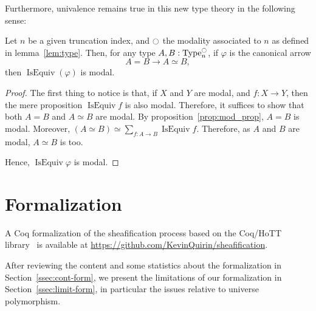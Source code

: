 \documentclass[notfinal]{jfrarticle}
\DeclareMathOperator{\Type}{Type}
\DeclareMathOperator{\IsEquiv}{IsEquiv}
\newcommand{\modal}{\ensuremath{\ocircle}}
\begin{document}
Furthermore, univalence remains
true in this new type theory in the following sense:
\begin{prop}\label{prop:univalence}
  Let $n$ be a given truncation index, and $\modal$ the modality
  associated to $n$ as defined in lemma~\ref{lem:type}. Then, for
  any type $A,B:\Type_n^\modal$, if $\varphi$ is the canonical arrow
  $$A = B \to A\simeq B,$$
  then $\IsEquiv(\varphi)$ is modal.
\end{prop}
\begin{proof}
  The first thing to notice is that, if $X$ and $Y$ are modal, and
  $f:X \to Y$, then the mere proposition $\IsEquiv f$ is also modal.
  Therefore, it suffices to show that both $A=B$ and $A\simeq B$ are
  modal. By proposition~\ref{prop:mod_prop}, $A=B$ is modal. 
  Moreover, $(A\simeq B) \simeq \sum_{f:A\to B} \IsEquiv
  f$. Therefore, as $A$ and $B$ are modal, $A\simeq B$ is too. 

  Hence, $\IsEquiv \varphi$ is modal.
\end{proof}


\section{Formalization}
\label{sec:sheaf-formalization}

A Coq formalization of the sheafification process based on the
Coq/HoTT library~\cite{hottlib} is available at
\url{https://github.com/KevinQuirin/sheafification}.

After reviewing the content and some statistics about the
formalization in Section~\ref{ssec:cont-form}, we present the
limitations of our formalization in Section~\ref{ssec:limit-form}, in
particular the issues relative to universe polymorphism. 
\end{document}

